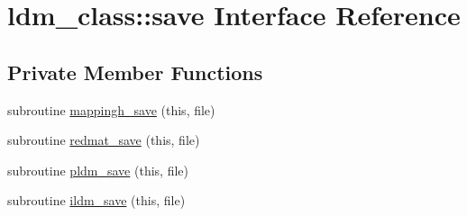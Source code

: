 \hypertarget{interfaceldm__class_1_1save}{\section{ldm\+\_\+class\+:\+:save Interface Reference}
\label{interfaceldm__class_1_1save}
}
\subsection*{Private Member Functions}
\begin{DoxyCompactItemize}
\item 
subroutine \hyperlink{interfaceldm__class_1_1save_a2d6c29ab670d534c66c8b1c5114e8a2d}{mappingh\+\_\+save} (this, file)
\item 
subroutine \hyperlink{interfaceldm__class_1_1save_a0ed3eaec281b5b36a20bb73523240790}{redmat\+\_\+save} (this, file)
\item 
subroutine \hyperlink{interfaceldm__class_1_1save_a1b738b01741a53ba4ab11775036839d3}{pldm\+\_\+save} (this, file)
\item 
subroutine \hyperlink{interfaceldm__class_1_1save_a8391f708790ded5a97a23120772feb74}{ildm\+\_\+save} (this, file)
\end{DoxyCompactItemize}


